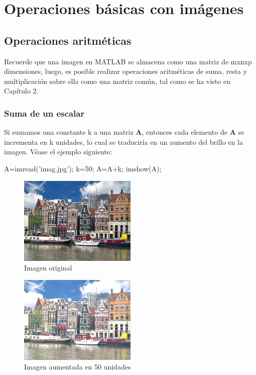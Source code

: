 \section{Operaciones básicas con imágenes}

\subsection{Operaciones aritméticas}

Recuerde que una imagen en MATLAB se almacena como una matriz de mxnxp
dimensiones, luego, es posible realizar operaciones aritméticas de suma,
resta y multiplicación sobre ella como una matriz común, tal como se ha
visto en Capítulo 2.

\subsubsection{Suma de un escalar}

Si sumamos una constante k a una matriz \textbf{A}, entonces cada
elemento de \textbf{A} se incrementa en k unidades, lo cual se
traduciría en un aumento del brillo en la imagen. Véase el ejemplo
siguiente:

\begin{matlab}
A=imread('imag.jpg');
k=50;
A=A+k;
imshow(A);
\end{matlab}

\begin{figure}[htbp]
    \centering
    \includegraphics[width=0.5\textwidth]{images/ch7/holland_original.png}
    \caption{Imagen original}
    \label{fig:holland_original}
\end{figure}

\begin{figure}[htbp]
    \centering
    \includegraphics[width=0.5\textwidth]{images/ch7/holland_mas50.png}
    \caption{Imagen aumentada en 50 unidades}
    \label{fig:holland_mas50}
\end{figure}

